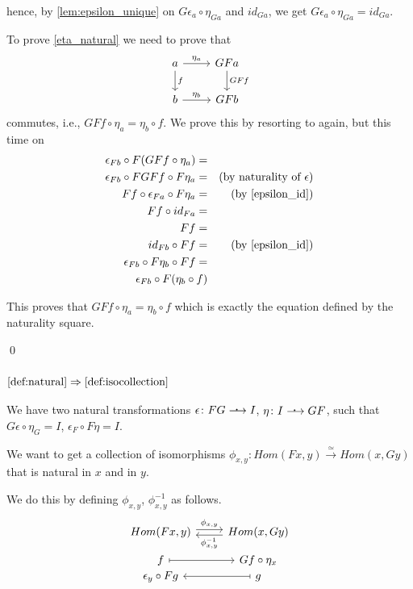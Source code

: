 \documentclass[]{article}
\newcommand{\dotarrow}{%
	\mathrel{\ooalign{\hss\raise.65ex\hbox{\scalebox{1.25}{\normalfont .}}%
	\kern0.35ex\hss\cr$\longrightarrow$}}}
\begin{document}
 hence, by \cref{lem:epsilon_unique} on $G\epsilon_a \circ \eta_{Ga}$ and $id_{Ga}$, we get $G\epsilon_a \circ \eta_{Ga} = id_{Ga}$. 

 \blackqed
 
 
To prove \cref{eta_natural} we need to prove that
\[
\begin{tikzcd}
a \arrow[r, "\eta_a"] \arrow[d, "{f}"] 
& GF a \arrow[d,"GF f"] \\
b \arrow[r, "\eta_b"] & GF b
\end{tikzcd}
\]
commutes, i.e., $GF f \circ \eta_a = \eta_b \circ f$. We prove this by resorting to  again, but this time on
\[
\begin{aligned}
\epsilon_{Fb} \circ F(GF f \circ \eta_a) =
\\ \epsilon_{Fb} \circ FGF f \circ F \eta_a = && \text{(by naturality of $\epsilon$)}
\\ F f \circ \epsilon_{Fa} \circ F \eta_a = && \text{(by \cref{epsilon_id})}
\\ F f \circ id_{Fa} =
\\ F f = 
\\ id_{Fb} \circ F f = && \text{(by \cref{epsilon_id})}
\\ \epsilon_{Fb} \circ F \eta_b \circ F f =
\\ \epsilon_{Fb} \circ F (\eta_b \circ f)
\end{aligned}
\]

This proves that $GF f \circ \eta_a = \eta_b \circ f$ which is exactly the equation defined by the naturality square.

\qed

\subsubsection{$\ref{def:natural} \Rightarrow \ref{def:isocollection}$}
We have two natural transformations $\epsilon \colon FG \dotarrow I$, $\eta \colon I \dotarrow GF$, such that $G\epsilon \circ \eta_G = I$, $\epsilon_F \circ F\eta = I$.

We want to get a collection of isomorphisms $\phi_{x,y} \colon Hom(Fx, y) \stackrel{\simeq}{\longrightarrow} Hom(x, Gy)$ that is natural in $x$ and in $y$.

We do this by defining $\phi_{x,y}$, $\phi_{x,y}^{-1}$ as follows.
\[
\begin{tikzcd}
Hom(Fx, y) \arrow[r, shift left, "\phi_{x,y}"] & \arrow[l, shift left, "\phi_{x,y}^{-1}"] Hom(x,Gy) \\[-10pt]
f \arrow[r, maps to] & Gf \circ \eta_x \\[-20pt]
\epsilon_y \circ F g & g \arrow[l, maps to]
\end{tikzcd}
\]
\end{document}
